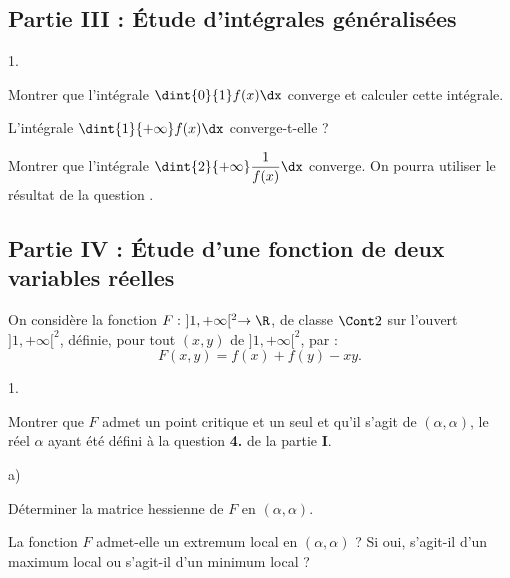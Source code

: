 \newpage


\subsection*{Partie III : Étude d'intégrales généralisées}
\begin{noliste}{1.}
\setlength{\itemsep}{2mm}
\setcounter{enumi}{9}
\item Montrer que l'intégrale $\dint{0}{1} f(x)\dx$ converge et 
calculer 
cette intégrale.


 
\item L'intégrale $\dint{1}{+\infty} f(x)\dx$ converge-t-elle ?

  


\item Montrer que l'intégrale $\dint{2}{+\infty} \dfrac{1}{f(x)}\dx$
  converge.  On pourra utiliser le résultat de la question
  .


\end{noliste}


\subsection*{Partie IV : Étude d'une fonction de deux variables
  réelles}

\noindent
On considère la fonction $F: \ ]1,+\infty[^2 \rightarrow \R$, de classe 
$\Cont 2$ sur l'ouvert $]1,+\infty[^2$, définie, pour tout $(x,y)$ de 
$]1,+\infty[^2$, par :
\[
F(x,y)=f(x)+f(y)-xy.
\]
\begin{noliste}{1.}
\setlength{\itemsep}{2mm}
\setcounter{enumi}{12}
\item Montrer que $F$ admet un point critique et un seul et qu'il 
s'agit 
de $(\alpha,\alpha)$, le réel $\alpha$ ayant été défini à la question 
{\bf 4.} de la partie {\bf I}.




\item \begin{noliste}{a)}
	\item Déterminer la matrice hessienne de $F$ en 
	$(\alpha,\alpha)$.
	
	
	
	\item La fonction $F$ admet-elle un extremum local en 
	$(\alpha,\alpha)$ ? Si oui, s'agit-il d'un maximum local ou 
	s'agit-il d'un minimum local ?
	
	
	\end{noliste}
\end{noliste}


